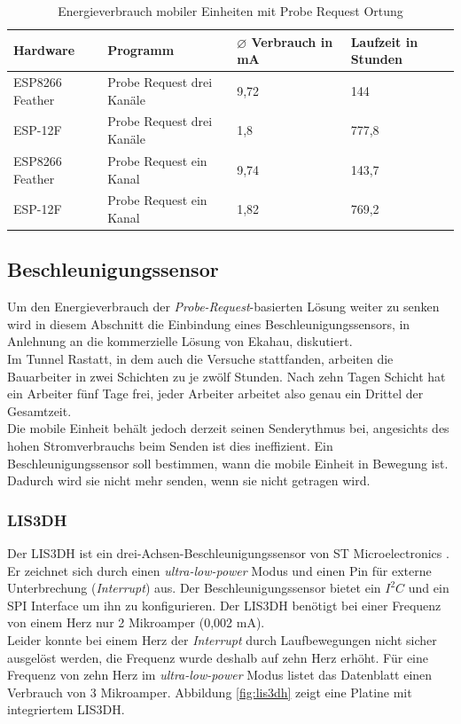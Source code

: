 \begin{table}[h!]
	\centering
	\caption{Energieverbrauch mobiler Einheiten mit Probe Request Ortung}
	\label{table:probereqina}
	\begin{tabular}{p{3.5cm}|p{5cm}|p{2.5cm}|p{2.5cm}}
		Hardware & Programm & $\varnothing$ Verbrauch in mA & Laufzeit in Stunden\\
		\hline
		ESP8266 Feather & Probe Request drei Kanäle & 9,72 & 144\\
		ESP-12F & Probe Request drei Kanäle & 1,8 & 777,8\\
		ESP8266 Feather & Probe Request ein Kanal & 9,74 & 143,7\\
		ESP-12F & Probe Request ein Kanal & 1,82 & 769,2\\
	\end{tabular}
\end{table}

\subsection{Beschleunigungssensor}
\label{ch:Beschleunigungssensor}
Um den Energieverbrauch der \emph{Probe-Request}-basierten Lösung weiter zu senken wird in diesem Abschnitt die Einbindung eines Beschleunigungssensors, in Anlehnung an die kommerzielle Lösung von Ekahau, diskutiert. \\
Im Tunnel Rastatt, in dem auch die Versuche stattfanden, arbeiten die Bauarbeiter in zwei Schichten zu je zwölf Stunden. 
Nach zehn Tagen Schicht hat ein Arbeiter fünf Tage frei, jeder Arbeiter arbeitet also genau ein Drittel der Gesamtzeit. \\
Die mobile Einheit behält jedoch derzeit seinen Senderythmus bei, angesichts des hohen Stromverbrauchs beim Senden ist dies ineffizient.
Ein Beschleunigungssensor soll bestimmen, wann die mobile Einheit in Bewegung ist. 
Dadurch wird sie nicht mehr senden, wenn sie nicht getragen wird.

\subsubsection{LIS3DH}
Der LIS3DH ist ein drei-Achsen-Beschleunigungssensor von ST Microelectronics \cite{st2015lis}.
Er zeichnet sich durch einen \emph{ultra-low-power} Modus und einen Pin für externe Unterbrechung (\emph{Interrupt}) aus.
Der Beschleunigungssensor bietet ein $I^2C$ und ein SPI Interface um ihn zu konfigurieren.
Der LIS3DH benötigt bei einer Frequenz von einem Herz nur 2 Mikroamper (0,002 mA).\\
Leider konnte bei einem Herz der \emph{Interrupt} durch Laufbewegungen nicht sicher ausgelöst werden, die Frequenz wurde deshalb auf zehn Herz erhöht.
Für eine Frequenz von zehn Herz im \emph{ultra-low-power} Modus listet das Datenblatt einen Verbrauch von 3 Mikroamper.
Abbildung \ref{fig:lis3dh} zeigt eine Platine mit integriertem LIS3DH.

